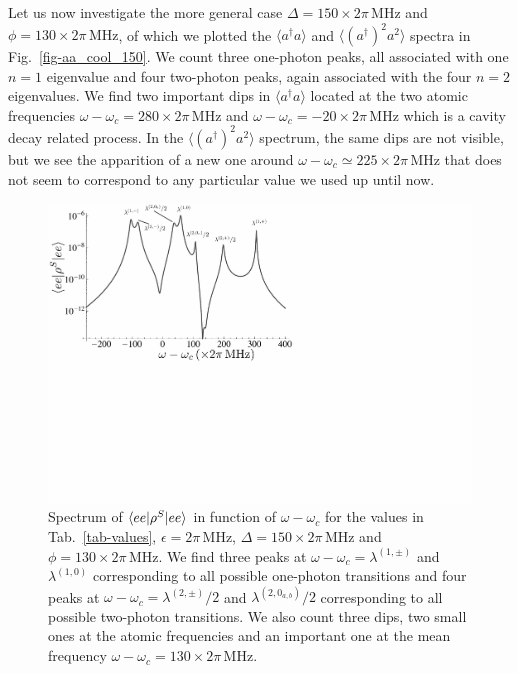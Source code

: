 Let us now investigate the more general case $\Delta=150 \times 2\pi\,\mbox{MHz}$ and $\phi = 130\times 2\pi\,\mbox{MHz}$, of which we plotted the $\langle a^\dagger a \rangle$ and $\langle (a^\dagger)^2 a^2 \rangle$ spectra in Fig.~\ref{fig-aa_cool_150}. We count three one-photon peaks, all associated with one $n=1$ eigenvalue and four two-photon peaks, again associated with the four $n=2$ eigenvalues. We find two important dips in $\langle a^\dagger a \rangle$ located at the two atomic frequencies $\omega-\omega_c=280 \times 2\pi\,\mbox{MHz}$ and $\omega-\omega_c=-20 \times 2\pi\,\mbox{MHz}$ which is a cavity decay related process. In the $\langle (a^\dagger)^2 a^2 \rangle$ spectrum, the same dips are not visible, but we see the apparition of a new one around $\omega-\omega_c \simeq 225 \times 2\pi\,\mbox{MHz}$ that does not seem to correspond to any particular value we used up until now.

\begin{figure}
    \center
    \includegraphics[width=0.75 \textwidth]{Images/chap5/ee_cool.pdf}
    \caption[$\prodsc{ee}{\rho^S}{ee}$ in function of $\omega-\omega_c$]{Spectrum of $\prodsc{ee}{\rho^S}{ee}$ in function of $\omega-\omega_c$ for the values in Tab.~\ref{tab-values}, $\epsilon= 2\pi\,\mbox{MHz}$, $\Delta=150 \times 2\pi\,\mbox{MHz}$ and $\phi=130\times 2\pi\,\mbox{MHz}$. We find three peaks at $\omega-\omega_c=\lambda^{(1,\pm)}$ and $\lambda^{(1,0)}$ corresponding to all possible one-photon transitions and four peaks at $\omega-\omega_c = \lambda^{(2,\pm)}/2$ and $\lambda^{(2,0_{a,b})}/2$ corresponding to all possible two-photon transitions. We also count three dips, two small ones at the atomic frequencies and an important one at the mean frequency $\omega-\omega_c = 130 \times 2\pi\,\mbox{MHz}$.}
    \label{fig-ee_cool}
\end{figure}

